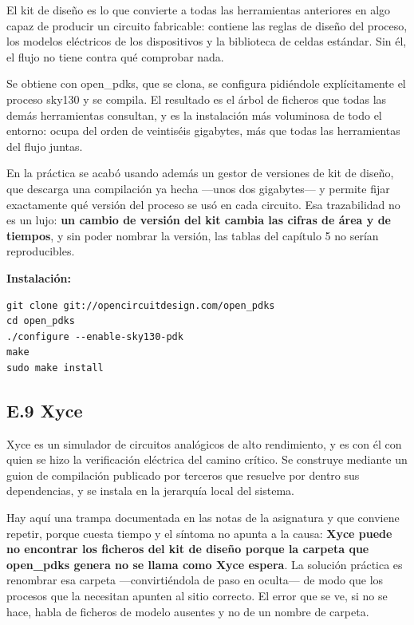 El kit de diseño es lo que convierte a todas las herramientas anteriores
en algo capaz de producir un circuito fabricable: contiene las reglas de
diseño del proceso, los modelos eléctricos de los dispositivos y la
biblioteca de celdas estándar. Sin él, el flujo no tiene contra qué
comprobar nada.

Se obtiene con open\_pdks, que se clona, se configura pidiéndole
explícitamente el proceso sky130 y se compila. El resultado es el árbol
de ficheros que todas las demás herramientas consultan, y es la
instalación más voluminosa de todo el entorno: ocupa del orden de
veintiséis gigabytes, más que todas las herramientas del flujo juntas.

En la práctica se acabó usando además un gestor de versiones de kit de
diseño, que descarga una compilación ya hecha ---unos dos gigabytes--- y
permite fijar exactamente qué versión del proceso se usó en cada
circuito. Esa trazabilidad no es un lujo: \textbf{un cambio de versión
del kit cambia las cifras de área y de tiempos}, y sin poder nombrar la
versión, las tablas del capítulo 5 no serían reproducibles.

\textbf{Instalación:}

\begin{verbatim}
git clone git://opencircuitdesign.com/open_pdks
cd open_pdks
./configure --enable-sky130-pdk
make
sudo make install
\end{verbatim}

\subsection{E.9 Xyce}\label{e.9-xyce}

Xyce es un simulador de circuitos analógicos de alto rendimiento, y es
con él con quien se hizo la verificación eléctrica del camino crítico.
Se construye mediante un guion de compilación publicado por terceros que
resuelve por dentro sus dependencias, y se instala en la jerarquía local
del sistema.

Hay aquí una trampa documentada en las notas de la asignatura y que
conviene repetir, porque cuesta tiempo y el síntoma no apunta a la
causa: \textbf{Xyce puede no encontrar los ficheros del kit de diseño
porque la carpeta que open\_pdks genera no se llama como Xyce espera}.
La solución práctica es renombrar esa carpeta ---convirtiéndola de paso
en oculta--- de modo que los procesos que la necesitan apunten al sitio
correcto. El error que se ve, si no se hace, habla de ficheros de modelo
ausentes y no de un nombre de carpeta.

